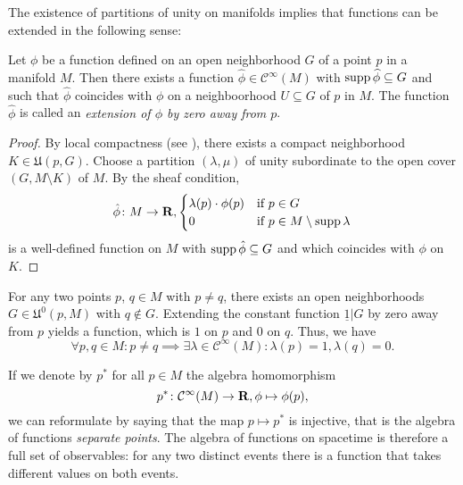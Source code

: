 The existence of partitions of unity on manifolds implies that functions can
be extended in the following sense:

\begin{cor}
  Let $\phi$ be a function defined on an open
  neighborhood $G$ of a point $p$
  in a manifold $M$. Then there exists a function $\widehat \phi \in \mathcal C^\infty(M)$
  with $\operatorname{supp} \widehat\phi \subseteq G$ and
  such that $\widehat \phi$ coincides with $\phi$ on a neighboorhood $U \subseteq G$
  of $p$ in $M$. The function $\widehat \phi$ is called an \emph{extension of $\phi$
  by zero away from $p$}.
\end{cor}

\begin{proof}
  By local compactness (see ),
  there exists a compact neighborhood $K \in \mathfrak U(p, G)$.
  Choose a partition $(\lambda, \mu)$ of unity subordinate to the open cover
  $(G, M \setminus K)$ of $M$. By the sheaf condition,
  \[
    \hat\phi\colon M \to \mathbf{R},
    \begin{cases}
      \lambda(p) \cdot \phi(p) & \text{if $p \in G$} \\
      0 & \text{if $p \in M \setminus \operatorname{supp} \lambda$}
    \end{cases}
  \]
  is a well-defined function on $M$ with $\operatorname{supp} \hat\phi \subseteq G$ and
  which coincides with $\phi$ on $K$.
\end{proof}

For any two points $p$, $q \in M$ with $p \neq q$, there exists an open
neighborhoods $G \in \mathfrak U^0(p, M)$ with $q \notin G$. Extending the
constant function $\underline 1|G$ by zero away from $p$ yields a function,
which is $1$ on $p$ and $0$ on $q$. Thus, we have
\begin{equation}
  \label{eq:point_separation}
  \forall p, q \in M : p \neq q \implies
  \exists \lambda \in \mathcal C^\infty(M) : \lambda(p) = 1, \lambda(q) = 0.
\end{equation}

If we denote by $p^*$ for all $p \in M$ the algebra homomorphism
\begin{equation}
  p^*\colon \mathcal C^\infty(M) \to \mathbf{R}, \phi \mapsto \phi(p),
\end{equation}
we can reformulate  by saying that the map $p \mapsto p^*$ is injective,
that is the algebra of functions \emph{separate points}. The algebra of functions
on spacetime is therefore a full set of observables: for any two distinct events
there is a function that takes different values on both events.


